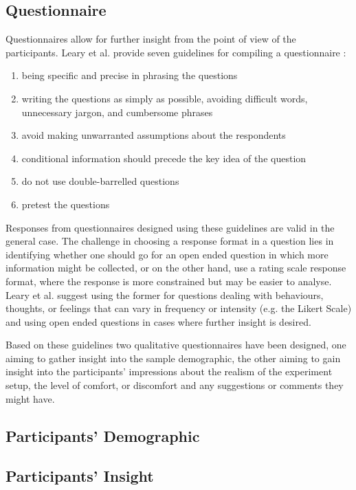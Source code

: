 \subsection{Questionnaire}
Questionnaires allow for further insight from the point of view of the participants. Leary et al. provide seven guidelines for compiling a questionnaire \cite{introductiontobehavioralresearchmethods}:
\begin{enumerate}
	\item being specific and precise in phrasing the questions
	\item writing the questions as simply as possible, avoiding difficult words, unnecessary jargon, and cumbersome phrases
	\item avoid making unwarranted assumptions about the respondents
	\item conditional information should precede the key idea of the question
	\item do not use double-barrelled questions
	\item pretest the questions
\end{enumerate}
Responses from questionnaires designed using these guidelines are valid in the general case. The challenge in choosing a response format in a question lies in identifying whether one should go for an open ended question in which more information might be collected, or on the other hand, use a rating scale response format, where the response is more constrained but may be easier to analyse. Leary et al. suggest using the former for questions dealing with behaviours, thoughts, or feelings that can vary in frequency or intensity (e.g. the Likert Scale\cite{likert1932technique}) and using open ended questions in cases where further insight is desired.

Based on these guidelines two qualitative questionnaires have been designed, one aiming to gather insight into the sample demographic, the other aiming to gain insight into the participants' impressions about the realism of the experiment setup, the level of comfort, or discomfort and any suggestions or comments they might have. 

\subsection{Participants' Demographic}

\subsection{Participants' Insight}

